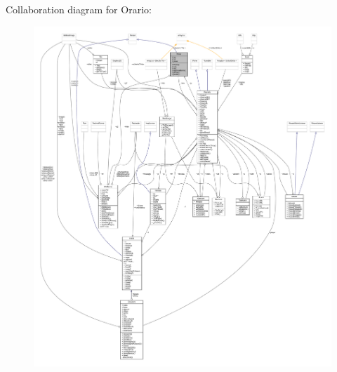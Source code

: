 Collaboration diagram for Orario\+:
\nopagebreak
\begin{figure}[H]
\begin{center}
\leavevmode
\includegraphics[width=350pt]{classa_1_1survival_1_1game_1_1_orario__coll__graph}
\end{center}
\end{figure}
